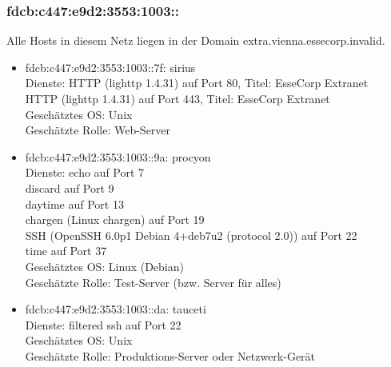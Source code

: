 \documentclass[12pt,a4paper,titlepage,oneside]{scrartcl}
\begin{document}
\subsubsection{fdcb:c447:e9d2:3553:1003::}
Alle Hosts in diesem Netz liegen in der Domain extra.vienna.essecorp.invalid.
\begin{itemize}
	\item fdcb:c447:e9d2:3553:1003::7f: sirius
	\\Dienste: HTTP (lighttp 1.4.31) auf Port 80, Titel: EsseCorp Extranet
	\\HTTP (lighttp 1.4.31) auf Port 443, Titel: EsseCorp Extranet
	\\Geschätztes OS: Unix
	\\Geschätzte Rolle: Web-Server
	
	\item fdcb:c447:e9d2:3553:1003::9a: procyon
	\\Dienste: echo auf Port 7
	\\discard auf Port 9
	\\daytime auf Port 13
	\\chargen (Linux chargen) auf Port 19
	\\SSH (OpenSSH 6.0p1 Debian 4+deb7u2 (protocol 2.0)) auf Port 22
	\\time auf Port 37
	\\Geschätztes OS: Linux (Debian)
	\\Geschätzte Rolle: Test-Server (bzw. Server für alles)
	
	\item fdcb:c447:e9d2:3553:1003::da: tauceti
	\\Dienste: filtered ssh auf Port 22
	\\Geschätztes OS: Unix
	\\Geschätzte Rolle: Produktions-Server oder Netzwerk-Gerät
	
\end{itemize}
\end{document}

